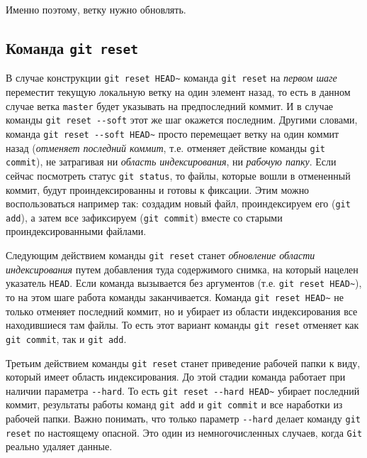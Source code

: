 \documentclass[%
	11pt,
	a4paper,
	utf8,
		]{article}
\begin{document}
Именно поэтому, ветку нужно обновлять.


\subsection{Команда \texttt{git reset}}

В случае конструкции \texttt{git reset HEAD\~} команда \texttt{git reset} на \emph{первом шаге} переместит текущую локальную ветку на один элемент назад, то есть в данном случае ветка \texttt{master} будет указывать на предпоследний коммит. И в случае команды \verb|git reset --soft| этот же шаг окажется последним. Другими словами, команда \verb|git reset --soft HEAD~| просто перемещает ветку на один коммит назад (\emph{отменяет последний коммит}, т.е. отменяет действие команды \texttt{git commit}), не затрагивая ни \emph{область индексирования}, ни \emph{рабочую папку}. Если сейчас посмотреть статус \texttt{git status}, то файлы, которые вошли в отмененный коммит, будут проиндексированны и готовы к фиксации. Этим можно воспользоваться например так: создадим новый файл, проиндексируем его (\texttt{git add}), а затем все зафиксируем (\texttt{git commit}) вместе со старыми проиндексированными файлами.

Следующим действием команды \texttt{git reset} станет \emph{обновление области индексирования} путем добавления туда содержимого снимка, на который нацелен указатель \texttt{HEAD}. Если команда вызывается без аргументов (т.е. \texttt{git reset HEAD\~}), то на этом шаге работа команды заканчивается. Команда \texttt{git reset HEAD\~} не только отменяет последний коммит, но и убирает из области индексирования все находившиеся там файлы. То есть этот вариант команды \texttt{git reset} отменяет как \texttt{git commit}, так и \texttt{git add}.

Третьим действием команды \texttt{git reset} станет приведение рабочей папки к виду, который имеет область индексирования. До этой стадии команда работает при наличии параметра \verb|--hard|. То есть \verb|git reset --hard HEAD~| убирает последний коммит, результаты работы команд \texttt{git add} и \texttt{git commit} и все наработки из рабочей папки. Важно понимать, что только параметр \verb|--hard| делает команду \texttt{git reset} по настоящему опасной. Это один из немногочисленных случаев, когда \texttt{Git} реально удаляет данные. 
\end{document}
